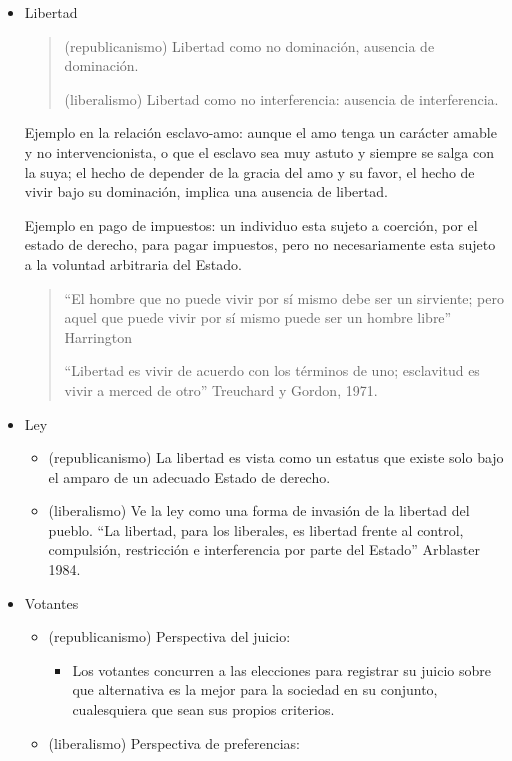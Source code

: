 \documentclass[
  letterpaper,
  DIV=11,
  numbers=noendperiod]{scrreprt}
\providecommand{\tightlist}{%
  \setlength{\itemsep}{0pt}\setlength{\parskip}{0pt}}\usepackage{longtable,booktabs,array}
\begin{document}
\begin{itemize}
\item
  Libertad

  \begin{quote}
  (republicanismo) Libertad como no dominación, ausencia de dominación.

  (liberalismo) Libertad como no interferencia: ausencia de
  interferencia.
  \end{quote}

  Ejemplo en la relación esclavo-amo: aunque el amo tenga un carácter
  amable y no intervencionista, o que el esclavo sea muy astuto y
  siempre se salga con la suya; el hecho de depender de la gracia del
  amo y su favor, el hecho de vivir bajo su dominación, implica una
  ausencia de libertad.

  Ejemplo en pago de impuestos: un individuo esta sujeto a coerción, por
  el estado de derecho, para pagar impuestos, pero no necesariamente
  esta sujeto a la voluntad arbitraria del Estado.

  \begin{quote}
  ``El hombre que no puede vivir por sí mismo debe ser un sirviente;
  pero aquel que puede vivir por sí mismo puede ser un hombre libre''
  Harrington

  ``Libertad es vivir de acuerdo con los términos de uno; esclavitud es
  vivir a merced de otro'' Treuchard y Gordon, 1971.
  \end{quote}
\item
  Ley

  \begin{itemize}
  \item
    (republicanismo) La libertad es vista como un estatus que existe
    solo bajo el amparo de un adecuado Estado de derecho.
  \item
    (liberalismo) Ve la ley como una forma de invasión de la libertad
    del pueblo. ``La libertad, para los liberales, es libertad frente al
    control, compulsión, restricción e interferencia por parte del
    Estado'' Arblaster 1984.
  \end{itemize}
\item
  Votantes

  \begin{itemize}
  \item
    (republicanismo) Perspectiva del juicio:

    \begin{itemize}
    \tightlist
    \item
      Los votantes concurren a las elecciones para registrar su juicio
      sobre que alternativa es la mejor para la sociedad en su conjunto,
      cualesquiera que sean sus propios criterios.
    \end{itemize}
  \item
    (liberalismo) Perspectiva de preferencias:


\end{itemize}
\end{itemize}
\end{document}
